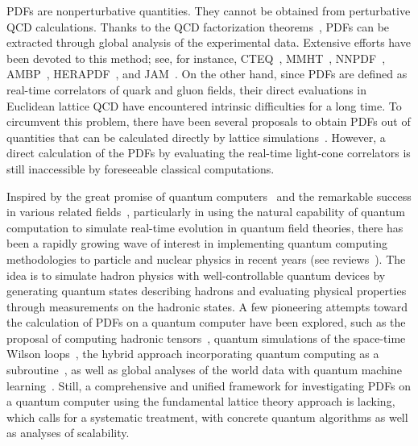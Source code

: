 \documentclass[aps,prl,twocolumn,superscriptaddress,notitlepage,nofootinbib]{revtex4-1}
\begin{document}
PDFs are nonperturbative quantities. They cannot be obtained from perturbative QCD calculations. Thanks to the QCD factorization theorems~\cite{Collins:1989gx}, PDFs can be extracted through global analysis of the experimental data. Extensive efforts have been devoted to this method; see, for instance, CTEQ~\cite{Hou:2019efy}, MMHT~\cite{Harland-Lang:2014zoa}, NNPDF~\cite{NNPDF:2017mvq}, AMBP~\cite{Alekhin:2017kpj}, HERAPDF~\cite{H1:2015ubc}, and JAM~\cite{Ethier:2017zbq,Barry:2018ort}. On the other hand, since PDFs are defined as real-time correlators of quark and gluon fields, their direct evaluations in Euclidean lattice QCD have encountered intrinsic difficulties for a long time. To circumvent this problem, there have been several proposals to obtain PDFs out of quantities that can be calculated directly by lattice simulations~\cite{Ji:2013dva, Ji:2014gla,Ma:2014jla, Ma:2017pxb,Radyushkin:2017cyf, Orginos:2017kos,Liang:2019frk,Chambers:2017dov,Sufian:2019bol,Izubuchi:2019lyk,Lin:2020ssv,Musch:2011er,Detmold:2001jb,LHPC:2007blg,Alexandrou:2015qia,Alexandrou:2020sml}.
However, a direct calculation of the PDFs by evaluating the real-time light-cone correlators is still inaccessible by foreseeable classical computations.  


Inspired by the great promise of quantum computers~\cite{Arute:2019zxq} and the remarkable success in various related fields~\cite{Alexeev:2019enj}, particularly in using the natural capability of quantum computation to simulate real-time evolution in quantum field theories, there has been a rapidly growing wave of interest in implementing quantum computing methodologies to particle and nuclear physics in recent years (see reviews~\cite{Cloet:2019wre, Zhang:2020uqo}).
The idea is to simulate hadron physics with well-controllable quantum devices by generating quantum states describing hadrons and evaluating physical properties through measurements on the hadronic states. A few pioneering attempts toward the calculation of PDFs on a quantum computer have been explored, such as the proposal of computing hadronic tensors~\cite{Lamm:2019uyc}, 
 quantum simulations of the space-time Wilson loops~\cite{Echevarria:2020wct}, 
the hybrid approach incorporating quantum computing as a subroutine~\cite{Mueller:2019qqj}, as well as global analyses of the world data with quantum machine learning~\cite{Perez-Salinas:2020nem}. Still, a comprehensive and unified framework for investigating PDFs on a quantum computer using the fundamental lattice theory approach is lacking, which calls for a systematic treatment, with concrete quantum algorithms as well as analyses of 
scalability. 
\end{document}
